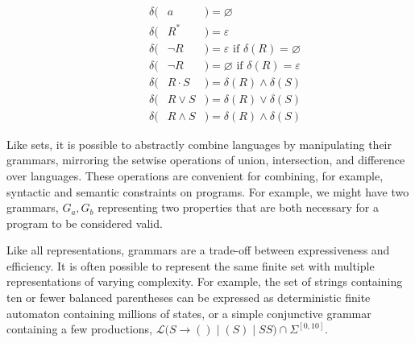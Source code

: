 \begin{multicols}{2}
\begin{eqnarray*}
    \phantom{---}\delta(& a           &)= \varnothing                                      \\
    \phantom{---}\delta(& R^*         &)= \varepsilon                                      \\
    \phantom{---}\delta(& \neg R      &)= \varepsilon \text{ if } \delta(R) = \varnothing  \\
    \phantom{---}\delta(& \neg R      &)= \varnothing \text{ if } \delta(R) = \varepsilon  \\
    \phantom{---}\delta(& R\cdot S    &)= \delta(R) \land \delta(S)                        \\
    \phantom{---}\delta(& R\vee S     &)= \delta(R) \vee  \delta(S)                        \\
    \phantom{---}\delta(& R\land S    &)= \delta(R) \land \delta(S)
  \end{eqnarray*}
\end{multicols}


Like sets, it is possible to abstractly combine languages by manipulating their grammars, mirroring the setwise operations of union, intersection, and difference over languages. These operations are convenient for combining, for example, syntactic and semantic constraints on programs. For example, we might have two grammars, $G_a, G_b$ representing two properties that are both necessary for a program to be considered valid. %

Like all representations, grammars are a trade-off between expressiveness and efficiency. It is often possible to represent the same finite set with multiple representations of varying complexity. For example, the set of strings containing ten or fewer balanced parentheses can be expressed as deterministic finite automaton containing millions of states, or a simple conjunctive grammar containing a few productions, $\mathcal{L}\Big(S \rightarrow ( ) \mid (S) \mid S S \Big) \cap \Sigma^{[0,10]}$.

\clearpage